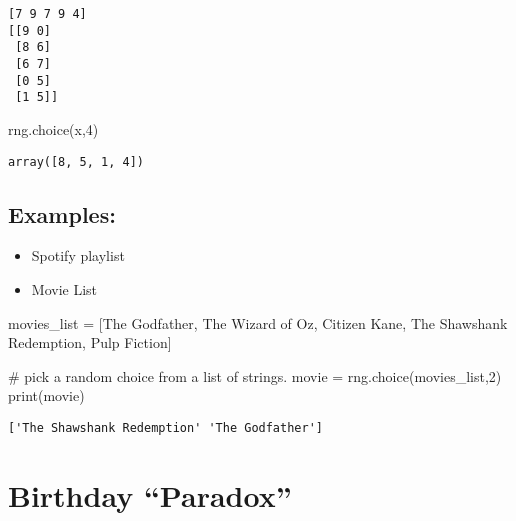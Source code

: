 \documentclass[
  letterpaper,
  DIV=11,
  numbers=noendperiod]{scrreprt}
\newenvironment{Shaded}{\begin{snugshade}}{\end{snugshade}}
\newcommand{\BuiltInTok}[1]{\textcolor[rgb]{0.00,0.23,0.31}{#1}}
\newcommand{\CommentTok}[1]{\textcolor[rgb]{0.37,0.37,0.37}{#1}}
\newcommand{\DecValTok}[1]{\textcolor[rgb]{0.68,0.00,0.00}{#1}}
\newcommand{\NormalTok}[1]{\textcolor[rgb]{0.00,0.23,0.31}{#1}}
\newcommand{\OperatorTok}[1]{\textcolor[rgb]{0.37,0.37,0.37}{#1}}
\newcommand{\StringTok}[1]{\textcolor[rgb]{0.13,0.47,0.30}{#1}}
\providecommand{\tightlist}{%
  \setlength{\itemsep}{0pt}\setlength{\parskip}{0pt}}\usepackage{longtable,booktabs,array}
\begin{document}
\begin{verbatim}
[7 9 7 9 4]
[[9 0]
 [8 6]
 [6 7]
 [0 5]
 [1 5]]
\end{verbatim}

\begin{Shaded}
\begin{Highlighting}[]
\NormalTok{rng.choice(x,}\DecValTok{4}\NormalTok{)}
\end{Highlighting}
\end{Shaded}

\begin{verbatim}
array([8, 5, 1, 4])
\end{verbatim}

\hypertarget{examples}{%
\subsection{Examples:}\label{examples}}

\begin{itemize}
\tightlist
\item
  Spotify playlist
\item
  Movie List
\end{itemize}

\begin{Shaded}
\begin{Highlighting}[]
\NormalTok{movies\_list }\OperatorTok{=}\NormalTok{ [}\StringTok{\textquotesingle{}The Godfather\textquotesingle{}}\NormalTok{, }\StringTok{\textquotesingle{}The Wizard of Oz\textquotesingle{}}\NormalTok{, }\StringTok{\textquotesingle{}Citizen Kane\textquotesingle{}}\NormalTok{, }\StringTok{\textquotesingle{}The Shawshank Redemption\textquotesingle{}}\NormalTok{, }\StringTok{\textquotesingle{}Pulp Fiction\textquotesingle{}}\NormalTok{]}

\CommentTok{\# pick a random choice from a list of strings.}
\NormalTok{movie }\OperatorTok{=}\NormalTok{ rng.choice(movies\_list,}\DecValTok{2}\NormalTok{)}
\BuiltInTok{print}\NormalTok{(movie)}
\end{Highlighting}
\end{Shaded}

\begin{verbatim}
['The Shawshank Redemption' 'The Godfather']
\end{verbatim}

\hypertarget{birthday-paradox}{%
\section{Birthday ``Paradox''}\label{birthday-paradox}}
\end{document}
